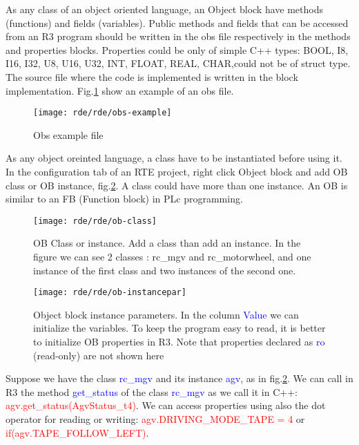 As any class of an object oriented language, an Object block have methods (functions) and fields (variables). Public methods and fields that can be accessed from an R3 program should be written in the obs file respectively in the methods and properties blocks.
Properties could be only of simple C++ types: BOOL, I8, I16, I32, U8, U16, U32, INT, FLOAT, REAL, CHAR,could not be of struct type.
The source file where the code is implemented is written in the block implementation. Fig.\ref{fig:obsex} show an example of an obs file.

\begin{figure}[h]
	\centering\texttt{[image: rde/rde/obs-example]}
	\caption{Obs example file}
	\label{fig:obsex}
\end{figure}

As any object oreinted language, a class have to be instantiated before using it. In the configuration tab of an RTE project, right click Object block and add OB class or OB instance, fig.\ref{fig:obclass}. A class could have more than one instance. An OB is similar to an FB (Function block) in PLc programming.

\begin{figure}[h]
	\centering\texttt{[image: rde/rde/ob-class]}
	\caption{OB Class or instance. Add a class than add an instance. In the figure we can see 2 classes : rc\_mgv and rc\_motorwheel, and one instance of the first class and two instances of the second one.}
	\label{fig:obclass}
\end{figure}

\begin{figure}[h]
	\centering\texttt{[image: rde/rde/ob-instancepar]}
	\caption{Object block instance parameters. In the column \textcolor{blue}{Value} we can initialize the variables. To keep the program easy to read, it is better to initialize OB properties in R3. Note that properties declared as \textcolor{blue}{ro} (read-only) are not shown here}
	\label{fig:obinstancepar}
\end{figure}

Suppose we have the class \textcolor{blue}{rc\_mgv} and its instance \textcolor{blue}{agv}, as in fig.\ref{fig:obclass}. We can call in R3 the method \textcolor{blue}{get\_status} of the class \textcolor{blue}{rc\_mgv} as we call it in C++: \textcolor{red}{agv.get\_status(AgvStatus\_t4)}. We can access properties using also the dot operator for reading or writing: \textcolor{red}{agv.DRIVING\_MODE\_TAPE = 4} or \textcolor{red}{if(agv.TAPE\_FOLLOW\_LEFT)}.

